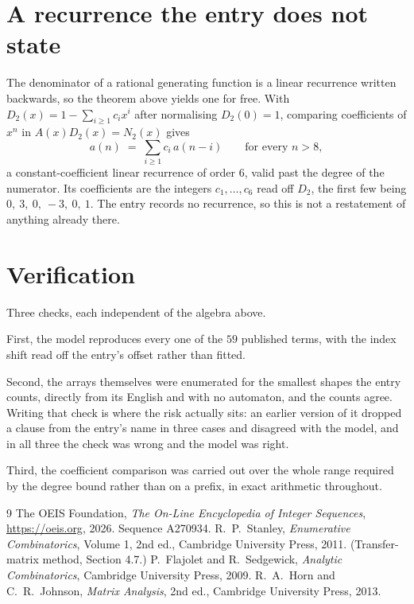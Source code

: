 \documentclass[11pt,a4paper]{article}
\theoremstyle{plain}
\theoremstyle{definition}
\begin{document}
\section{A recurrence the entry does not state}

The denominator of a rational generating function is a linear recurrence written backwards, so
the theorem above yields one for free. With $D_2(x)=1-\sum_{i\ge1}c_ix^i$ after normalising
$D_2(0)=1$, comparing coefficients of $x^n$ in $A(x)D_2(x)=N_2(x)$ gives
\[
a(n)\;=\;\sum_{i\ge1}c_i\,a(n-i)\qquad\text{for every }n>8,
\]
a constant-coefficient linear recurrence of order $6$, valid past the degree of the
numerator. Its coefficients are the integers $c_1,\dots,c_{6}$ read off $D_2$, the first few being $0,\ 3,\ 0,\ -3,\ 0,\ 1$. The entry records no recurrence, so this is not a restatement of anything
already there.

\section{Verification}

Three checks, each independent of the algebra above.

First, the model reproduces every one of the $59$ published terms, with the index shift
read off the entry's offset rather than fitted.

Second, the arrays themselves were enumerated for the smallest shapes the entry counts,
directly from its English and with no automaton, and the counts agree. Writing that check is
where the risk actually sits: an earlier version of it dropped a clause from the entry's name
in three cases and disagreed with the model, and in all three the check was wrong and the model
was right.

Third, the coefficient comparison was carried out over the whole range required by the degree
bound rather than on a prefix, in exact arithmetic throughout.

\begin{thebibliography}{9}
 The OEIS Foundation, \emph{The On-Line Encyclopedia of Integer
Sequences}, \url{https://oeis.org}, 2026. Sequence A270934.
 R.~P.~Stanley, \emph{Enumerative Combinatorics}, Volume 1, 2nd ed.,
Cambridge University Press, 2011. (Transfer-matrix method, Section 4.7.)
 P.~Flajolet and R.~Sedgewick, \emph{Analytic Combinatorics}, Cambridge
University Press, 2009.
 R.~A.~Horn and C.~R.~Johnson, \emph{Matrix Analysis}, 2nd ed., Cambridge
University Press, 2013.
\end{thebibliography}
\end{document}
